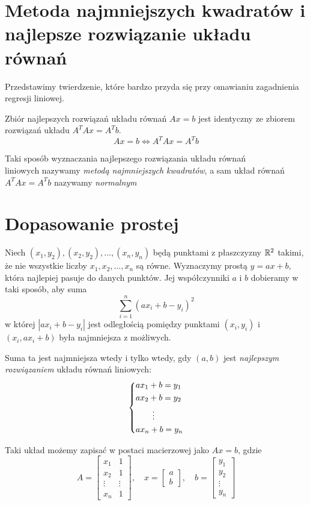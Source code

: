 \documentclass[a4paper,12pt]{article}
\begin{document}
\newpage

\section{Metoda najmniejszych kwadratów i najlepsze rozwiązanie układu równań}
Przedstawimy twierdzenie, które bardzo przyda się przy omawianiu zagadnienia regresji liniowej.
\begin{theorem}
	Zbiór najlepszych rozwiązań układu równań \(Ax = b\) jest identyczny ze zbiorem rozwiązań układu \(A^T Ax = A^T b\). 
	\[
		Ax = b \iff A^T Ax = A^T b
	\]
\end{theorem}
\begin{note}
	Taki sposób wyznaczania najlepszego rozwiązania układu równań \\ liniowych nazywamy \emph{metodą najmniejszych kwadratów}, a sam układ równań \\ \(A^T Ax = A^T b\) nazywamy \emph{normalnym}
\end{note}

\section{Dopasowanie prostej}
Niech \((x_1, y_2), (x_2, y_2), \dots , (x_{n}, y_{n})\) będą punktami z płaszczyzny \(\mathbb{R}^2\) takimi, że nie wszystkie liczby \(x_1,x_2, \dots , x_{n}\) są równe. Wyznaczymy prostą \(y = ax + b\), która najlepiej pasuje do danych punktów. Jej współczynniki \(a\) i \(b\) dobieramy w taki sposób, aby suma
\[
	\sum_{i=1}^{n} (ax_{i} + b - y_{i})^2
\]    
w której \(|ax_{i} + b - y_{i}|\) jest odległością pomiędzy punktami \((x_i, y_i)\) i \((x_i, ax_i + b)\) była najmniejsza z możliwych. 

Suma ta jest najmniejsza wtedy i tylko wtedy, gdy \((a,b)\) jest \emph{najlepszym rozwiązaniem} układu równań liniowych:
\[
	\begin{dcases}
		ax_1 + b = y_1 \\
		ax_2 + b = y_2 \\
		\qquad \vdots \\
		ax_n + b = y_n
	\end{dcases}
\]

Taki układ możemy zapisać w postaci macierzowej jako \(Ax = b\), gdzie
\[
	A = 
	\begin{bmatrix}
		x_1 & 1 \\
		x_2 & 1 \\
		\vdots & \vdots \\
		x_n & 1
	\end{bmatrix},
	\quad
	x = 
	\begin{bmatrix}
		a \\
		b
	\end{bmatrix},
	\quad
	b = 
	\begin{bmatrix}
		y_1 \\
		y_2 \\
		\vdots \\
		y_n
	\end{bmatrix}
\]
\end{document}
